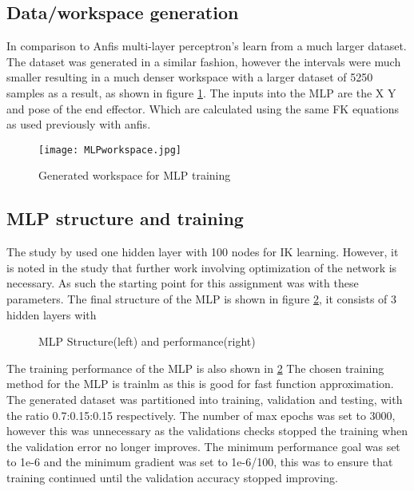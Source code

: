 \documentclass[a4paper,11pt]{article}
\begin{document}
\subsection{Data/workspace generation}
In comparison to Anfis multi-layer perceptron’s learn from a much larger dataset. The dataset was generated in a similar fashion, however the intervals were much smaller resulting in a much denser workspace with a larger dataset of 5250 samples as a result, as shown in figure \ref{fig:MLPwork}.
The inputs into the MLP are the X Y and pose of the end effector. Which are calculated using the same FK equations as used previously with anfis.




\begin{figure}[H]
\centering
  \texttt{[image: MLPworkspace.jpg]}
  \caption{Generated workspace for MLP training}
\label{fig:MLPwork}
\end{figure}

\newpage
\subsection{MLP structure and training}
The study by \cite{mlp1} used one hidden layer with 100 nodes for IK learning. However, it is noted in the study that further work involving optimization of the network is necessary. As such the starting point for this assignment was with these parameters. 
The final structure of the MLP is shown in figure \ref{fig:MLPstr}, it consists of 3 hidden layers with

\begin{figure}[H]

\begin{minipage}{.5\linewidth}
\centering
{}
\end{minipage}
\begin{minipage}{.5\linewidth}
\centering
{}
\end{minipage}\par\medskip

\caption{MLP Structure(left) and performance(right)}
\label{fig:MLPstr}
\end{figure}
The training performance of the MLP is also shown in \ref{fig:MLPstr} 
The chosen training method for the MLP is trainlm as this is good for fast function approximation.
The generated dataset was partitioned into training, validation and testing, with the ratio 0.7:0.15:0.15 respectively. The number of max epochs was set to 3000, however this was unnecessary as the validations checks stopped the training when the validation error no longer improves. The minimum performance goal was set to 1e-6 and the minimum gradient was set to 1e-6/100, this was to ensure that training continued until the validation accuracy stopped improving.
\end{document}
